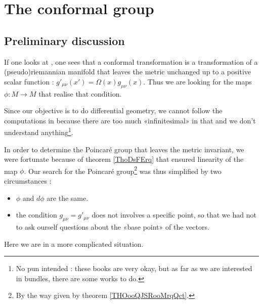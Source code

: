 
\section{The conformal group}

\subsection{Preliminary discussion}

If one looks at \cite{ooIYOHooMRMfXl,ooDPRUooOFPyPH}, one sees that a conformal transformation is a transformation of a (pseudo)riemannian manifold that leaves the metric unchanged up to a positive scalar function : \( g'_{\mu\nu}(x')=\Omega(x)g_{\mu\nu}(x)\). Thus we are looking for the maps \( \phi\colon M\to M\) that realise that condition.

Since our objective is to do differential geometry, we cannot follow the computations in \cite{ooIYOHooMRMfXl,ooDPRUooOFPyPH} because there are too much «infinitesimal» in that and we don't understand anything\footnote{No pun intended : these books are very okay, but as far as we are interested in bundles, there are some works to do.}.

In order to determine the Poincaré group that leaves the metric invariant, we were fortunate because of theorem \ref{ThoDsFErq} that ensured linearity of the map \( \phi\). Our search for the Poincaré group\footnote{By the way given by theorem \ref{THOooQJSRooMrqQct}.} was thus simplified by two circumstances :
\begin{itemize}
    \item \( \phi\) and \( d\phi\) are the same.
    \item the condition \( g_{\mu\nu}=g'_{\mu\nu}\) does not involves a specific point, so that we had not to ask ourself questions about the «base point» of the vectors.
\end{itemize}
Here we are in a more complicated situation. 

